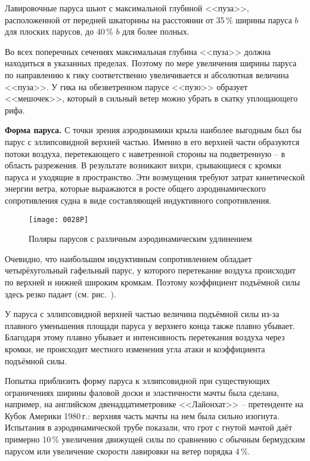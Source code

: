 Лавировочные паруса шьют с максимальной глубиной <<пуза>>, расположенной от передней шкаторины на расстоянии от 35\,\% ширины паруса $b$ для плоских парусов, до 40\,\% $b$ для более полных.

Во всех поперечных сечениях максимальная глубина <<пуза>> должна находиться в указанных пределах. Поэтому по мере увеличения ширины паруса по направлению к гику соответственно увеличивается и абсолютная величина <<пуза>>. У гика на обезветренном парусе <<пузо>> образует <<мешочек>>, который в сильный ветер можно убрать в скатку уплощающего рифа.

\textbf{Форма паруса.} С точки зрения аэродинамики крыла наиболее выгодным был бы парус с эллипсовидной верхней частью. Именно в его верхней части образуются потоки воздуха, перетекающего с наветренной стороны на подветренную \--- в область разрежения. В результате возникают вихри, срывающиеся с кромки паруса и уходящие в пространство. Эти возмущения требуют затрат кинетической энергии ветра, которые выражаются в росте общего аэродинамического сопротивления судна в виде составляющей индуктивного сопротивления. 

\begin{figure}[htb]
  \centering
  \texttt{[image: 0028P]}
  \caption{Поляры парусов с различным аэродинамическим удлинением}
  \label{fig:28}
\end{figure}

Очевидно, что наибольшим индуктивным сопротивлением обладает четырёхугольный гафельный парус, у которого перетекание воздуха происходит по верхней и нижней широким кромкам. Поэтому коэффициент подъёмной силы здесь резко падает (см. рис.~).

У паруса с эллипсовидной верхней частью величина подъёмной силы из-за плавного уменьшения площади паруса у верхнего конца также плавно убывает. Благодаря этому плавно убывает и интенсивность перетекания воздуха через кромки, не происходит местного изменения угла атаки и коэффициента подъёмной силы. 

Попытка приблизить форму паруса к эллипсовидной при существующих ограничениях ширины фаловой доски и эластичности мачты была сделана, например, на английском двенадцатиметровике <<Лайонхат>> \--- претенденте на Кубок Америки 1980\,г.: верхняя часть мачты на нем была сильно изогнута. Испытания в аэродинамической трубе показали, что грот с гнутой мачтой даёт примерно 10\,\% увеличения движущей силы по сравнению с обычным бермудским парусом или увеличение скорости лавировки на ветер порядка 4\,\%.
 
